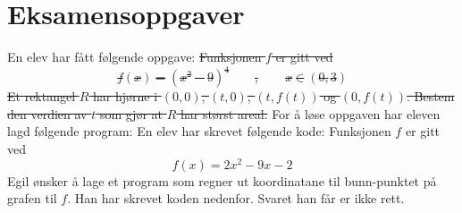 \section{Eksamensoppgaver}
En elev har fått følgende oppgave:
\st{
Funksjonen $ f $ er gitt ved
\[ f(x)=(x^2-9)^4\qquad,\qquad x\in(0, 3) \]
Et rektangel $ R $ har hjørne i $ (0, 0) $, $ (t, 0) $, $ (t, f(t)) $ og $ (0, f(t)) $.	\os
Bestem den verdien av $ t $ som gjør at $ R $ har størst areal.
}
For å løse oppgaven har eleven lagd følgende program:
\newpage
{}
En elev har skrevet følgende kode:
\newpage
{}
Funksjonen $ f $ er gitt ved
\[ f(x)=2x^2-9x-2 \]
Egil ønsker å lage et program som regner ut koordinatane til bunn-punktet på grafen til $ f $. Han har skrevet koden nedenfor.
Svaret han får er ikke rett.
